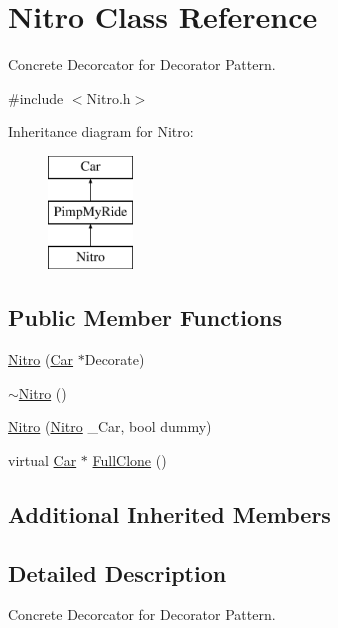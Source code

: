 \hypertarget{class_nitro}{}\section{Nitro Class Reference}
\label{class_nitro}


Concrete Decorcator for Decorator Pattern.  




{\ttfamily \#include $<$Nitro.\+h$>$}

Inheritance diagram for Nitro\+:\begin{figure}[H]
\begin{center}
\leavevmode
\includegraphics[height=3.000000cm]{class_nitro}
\end{center}
\end{figure}
\subsection*{Public Member Functions}
\begin{DoxyCompactItemize}
\item 
\mbox{\hyperlink{class_nitro_ae686f66dbacbf2a66345d04caa3d67ea}{Nitro}} (\mbox{\hyperlink{class_car}{Car}} $\ast$Decorate)
\item 
\mbox{\hyperlink{class_nitro_ac64ad126c7af7882afe5e7f67727a889}{$\sim$\+Nitro}} ()
\item 
\mbox{\hyperlink{class_nitro_a651d03025ee1e2e41e04be171e39b4d4}{Nitro}} (\mbox{\hyperlink{class_nitro}{Nitro}} \+\_\+\+Car, bool dummy)
\item 
virtual \mbox{\hyperlink{class_car}{Car}} $\ast$ \mbox{\hyperlink{class_nitro_a1574264a8ca8691bb3669c8a3a3ad5dd}{Full\+Clone}} ()
\end{DoxyCompactItemize}
\subsection*{Additional Inherited Members}


\subsection{Detailed Description}
Concrete Decorcator for Decorator Pattern. 

